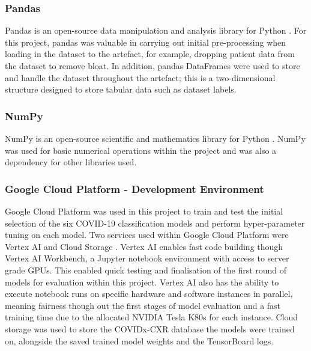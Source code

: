 \subsubsection{Pandas}
Pandas is an open-source data manipulation and analysis library for Python \citep{pandasPy63:online}. For this project, pandas was valuable in carrying out initial pre-processing when loading in the dataset to the artefact, for example, dropping patient data from the dataset to remove bloat. In addition, pandas DataFrames were used to store and handle the dataset throughout the artefact; this is a two-dimensional structure designed to store tabular data such as dataset labels.

\subsubsection{NumPy}
NumPy is an open-source scientific and mathematics library for Python \citep{NumPy90:online}. NumPy was used for basic numerical operations within the project and was also a dependency for other libraries used.

\subsubsection{Google Cloud Platform - Development Environment}
Google Cloud Platform was used in this project to train and test the initial selection of the six COVID-19 classification models and perform hyper-parameter tuning on each model. Two services used within Google Cloud Platform were Vertex AI \citep{VertexAI57:online} and Cloud Storage \citep{CloudSto72:online}. Vertex AI enables fast code building though Vertex AI Workbench, a Jupyter notebook environment with access to server grade GPUs. This enabled quick testing and finalisation of the first round of models for evaluation within this project. Vertex AI also has the ability to execute notebook runs on specific hardware and software instances in parallel, meaning fairness though out the first stages of model evaluation and a fast training time due to the allocated NVIDIA Tesla K80s for each instance. Cloud storage was used to store the COVIDx-CXR database the models were trained on, alongside the saved trained model weights and the TensorBoard logs.

